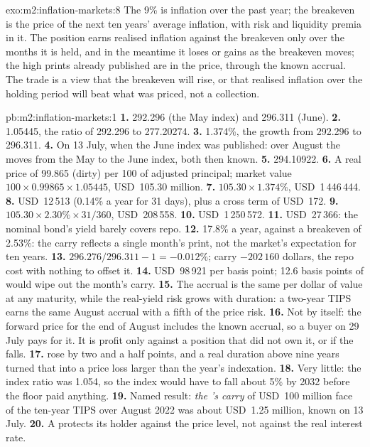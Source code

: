 \begin{solution}{exo:m2:inflation-markets:8}
The 9\% is inflation over the past year; the breakeven is the price of the
next ten years' average inflation, with risk and liquidity premia in it. The
position earns realised inflation against the breakeven only over the months
it is held, and in the meantime it loses or gains as the breakeven moves; the
high prints already published are in the price, through the known accrual.
The trade is a view that the breakeven will rise, or that realised inflation
over the holding period will beat what was priced, not a collection.
\end{solution}

\begin{solution}{pb:m2:inflation-markets:1}
\textbf{1.} 292.296 (the May index) and 296.311 (June).
\textbf{2.} 1.05445, the ratio of 292.296 to 277.20274.
\textbf{3.} 1.374\%, the growth from 292.296 to 296.311.
\textbf{4.} On 13 July, when the June index was published: over August the
 moves from the May to the June index, both then known.
\textbf{5.} 294.10922.
\textbf{6.} A real price of 99.865 (dirty) per 100 of adjusted principal; market
value $100 \times 0.99865 \times 1.05445$, USD~105.30 million.
\textbf{7.} $105.30 \times 1.374\%$, USD~1\,446\,444.
\textbf{8.} USD~12\,513 (0.14\% a year for 31 days), plus a cross term of USD~172.
\textbf{9.} $105.30 \times 2.30\% \times 31/360$, USD~208\,558.
\textbf{10.} USD~1\,250\,572.
\textbf{11.} USD~27\,366: the nominal bond's yield barely covers repo.
\textbf{12.} 17.8\% a year, against a breakeven of 2.53\%: the carry reflects a
single month's print, not the market's expectation for ten years.
\textbf{13.} $296.276/296.311 - 1 = -0.012\%$; carry $-202\,160$ dollars, the
repo cost with nothing to offset it.
\textbf{14.} USD~98\,921 per basis point; 12.6 basis points of  would
wipe out the month's carry.
\textbf{15.} The accrual is the same per dollar of value at any maturity, while
the real-yield risk grows with duration: a two-year TIPS earns the same
August accrual with a fifth of the price risk.
\textbf{16.} Not by itself: the forward price for the end of August includes the
known accrual, so a buyer on 29 July pays for it. It is profit only against
a position that did not own it, or if the  falls.
\textbf{17.}  rose by two and a half points, and a real duration above
nine years turned that into a price loss larger than the year's indexation.
\textbf{18.} Very little: the index ratio was 1.054, so the index would have to fall
about 5\% by 2032 before the floor paid anything.
\textbf{19.} Named result: \emph{the 's carry} of USD~100 million face of the
ten-year TIPS over August 2022 was about USD~1.25 million, known on 13 July.
\textbf{20.} A  protects its holder against the price level, not against
the real interest rate.
\end{solution}

